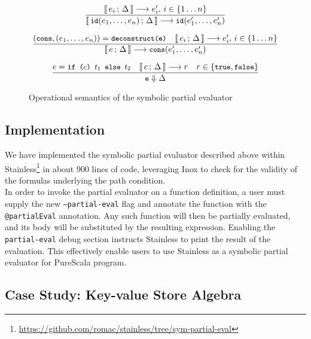 \documentclass[a4paper,twoside]{article}
\newcommand{\lb}[2]{\llbracket\, #1\,;\, #2\, \rrbracket}
\newcommand{\stt}[1]{\texttt{\small{#1}}}
\begin{document}
\begin{landscape}
\begin{figure}[htb]
\begin{framed}
\begin{equation}
\dfrac{
 \lb{e_i}{\Delta} \longrightarrow e_i',\, i \in \{1 \ldots n\}
}{
  \lb{\stt{id}(e_1,\ldots,e_n)}{\Delta} \longrightarrow
  \stt{id}(e_1',\ldots,e_n')
}
\label{fig:symbolicsem:fi3}
\end{equation}

\begin{equation}
\dfrac{
  (\stt{cons}, (e_1, \ldots, e_n)) = \stt{deconstruct(e)} \quad
  \lb{e_i}{\Delta} \longrightarrow e_i',\, i \in \{1 \ldots n\}
}{
  \lb{e}{\Delta} \longrightarrow \stt{cons}(e_1', \ldots, e_n')
}
\end{equation}

\begin{equation}
\dfrac{
 e = \stt{if ($c$) $t_1$ else $t_2$} \quad
 \lb{c}{\Delta} \longrightarrow r \quad
 r \in \{\stt{true}, \stt{false}\}
}{
  \stt{e} \Downarrow \Delta
}
\end{equation}

\end{framed}
\vspace{-10pt}
\caption{Operational semantics of the symbolic partial evaluator \label{fig:symbolicsem}}
\end{figure}
\end{landscape}

\subsection{Implementation}

We have implemented the symbolic partial evaluator described above within Stainless\footnote{\url{https://github.com/romac/stainless/tree/sym-partial-eval}} in about 900 lines of code, leveraging Inox to check for the validity of the formulas underlying the path condition.\\

In order to invoke the partial evaluator on a function definition, a user must supply the new \stt{--partial-eval} flag and annotate the function with the \stt{@partialEval} annotation. Any such function will then be partially evaluated, and its body will be substituted by the resulting expression. Enabling the \stt{partial-eval} debug section instructs Stainless to print the result of the evaluation. This effectively enable users to use Stainless as a symbolic partial evaluator for PureScala program.

\subsection{Case Study: Key-value Store Algebra}
\label{symcases}
\end{document}
